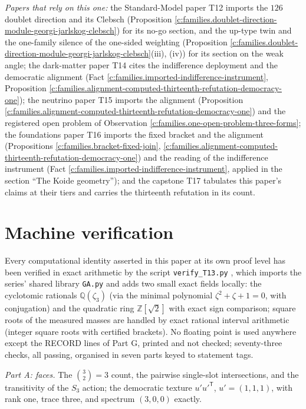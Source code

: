 \documentclass[11pt]{article}
\theoremstyle{definition}
\theoremstyle{plain}
\begin{document}
\emph{Papers that rely on this one:} the Standard-Model paper T12 \cite{ButlerT12} imports the $126$ doublet direction and its Clebsch (Proposition \ref{c:families.doublet-direction-module-georgi-jarlskog-clebsch}) for its no-go section, and the up-type twin and the one-family silence of the one-sided weighting (Proposition \ref{c:families.doublet-direction-module-georgi-jarlskog-clebsch}(iii), (iv)) for its section on the weak angle; the dark-matter paper T14 \cite{ButlerT14} cites the indifference deployment and the democratic alignment (Fact \ref{c:families.imported-indifference-instrument}, Proposition \ref{c:families.alignment-computed-thirteenth-refutation-democracy-one}); the neutrino paper T15 \cite{ButlerT15} imports the alignment (Proposition \ref{c:families.alignment-computed-thirteenth-refutation-democracy-one}) and the registered open problem of Observation \ref{c:families.one-open-problem-three-forms}; the foundations paper T16 \cite{ButlerT16} imports the fixed bracket and the alignment (Propositions \ref{c:families.bracket-fixed-join}, \ref{c:families.alignment-computed-thirteenth-refutation-democracy-one}) and the reading of the indifference instrument (Fact \ref{c:families.imported-indifference-instrument}, applied in the section ``The Koide geometry''); and the capstone T17 \cite{ButlerT17} tabulates this paper's claims at their tiers and carries the thirteenth refutation in its count.

\section{Machine verification}

\label{c:note.families.setting-machine-verification}
Every computational identity asserted in this paper at its own proof level has been verified in exact arithmetic by the script \texttt{verify\_T13.py} \cite{ButlerVerifyT13}, which imports the series' shared library \texttt{GA.py} and adds two small exact fields locally: the cyclotomic rationals $\mathbb{Q}(\zeta_{3})$ (via the minimal polynomial $\zeta^{2} + \zeta + 1 = 0$, with conjugation) and the quadratic ring $\mathbb{Z}[\sqrt{2}]$ with exact sign comparison; square roots of the measured masses are handled by exact rational interval arithmetic (integer square roots with certified brackets). No floating point is used anywhere except the RECORD lines of Part G, printed and not checked; seventy-three checks, all passing, organised in seven parts keyed to statement tags.

\emph{Part A: faces.} The $\binom{3}{2} = 3$ count, the pairwise single-slot intersections, and the transitivity of the $S_{3}$ action; the democratic texture $u'u'^{\mathsf{T}}$, $u' = (1,1,1)$, with rank one, trace three, and spectrum $(3, 0, 0)$ exactly.
\end{document}
